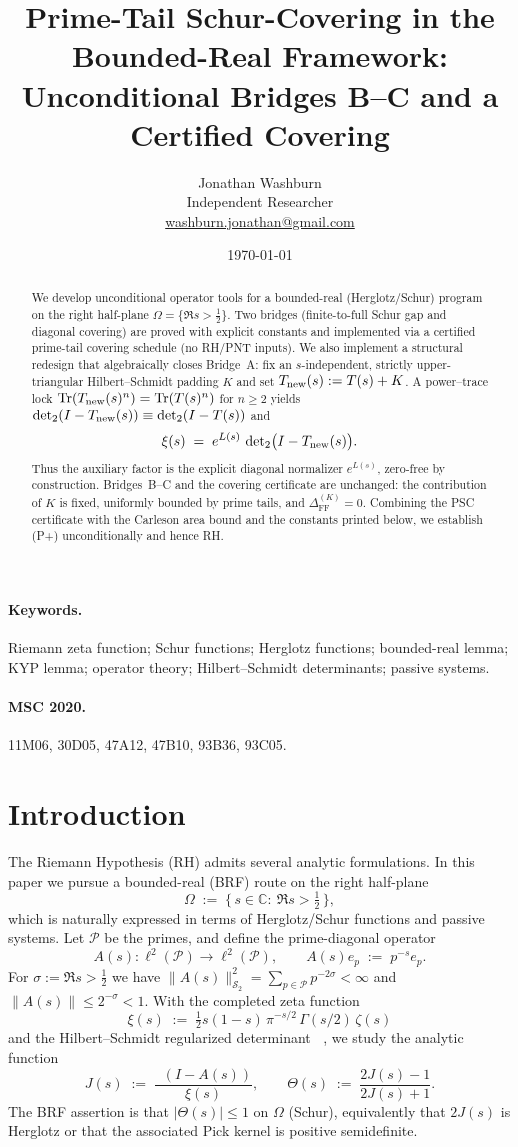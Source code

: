 \documentclass[11pt]{article}
\title{Prime-Tail Schur-Covering in the Bounded-Real Framework: Unconditional Bridges B--C and a Certified Covering}
\author{Jonathan Washburn\\ Independent Researcher\\ \href{mailto:washburn.jonathan@gmail.com}{washburn.jonathan@gmail.com}}
\date{\today}
\theoremstyle{definition}
\theoremstyle{remark}
\newcommand{\C}{\mathbb{C}}
\newcommand{\PP}{\mathcal{P}}
\newcommand{\HS}{\mathcal{S}_2}
\newcommand{\Half}{\{\,s\in\C:\ \Re s>\tfrac12\,\}}
\DeclareMathOperator{\Tr}{Tr}
\DeclareMathOperator{\dettwo}{det_2}
\begin{document}
\maketitle

\begin{abstract}
We develop unconditional operator tools for a bounded-real (Herglotz/Schur) program on the right half-plane \(\Omega=\{\Re s>\tfrac12\}\). Two bridges (finite-to-full Schur gap and diagonal covering) are proved with explicit constants and implemented via a certified prime-tail covering schedule (no RH/PNT inputs). We also implement a structural redesign that algebraically closes Bridge~A: fix an \(s\)-independent, strictly upper-triangular Hilbert--Schmidt padding \(K\) and set \(T_{\rm new}(s):=T(s)+K\). A power--trace lock \(\Tr(T_{\rm new}(s)^n)=\Tr(T(s)^n)\) for \(n\ge 2\) yields \(\det_2(I-T_{\rm new}(s))\equiv\det_2(I-T(s))\) and
\[
  \xi(s)\;=\;e^{L(s)}\,\det\nolimits_2\!\big(I-T_{\rm new}(s)\big).
\]
Thus the auxiliary factor is the explicit diagonal normalizer \(e^{L(s)}\), zero-free by construction. Bridges~B--C and the covering certificate are unchanged: the contribution of \(K\) is fixed, uniformly bounded by prime tails, and \(\Delta_{\mathrm{FF}}^{(K)}=0\). Combining the PSC certificate with the Carleson area bound and the constants printed below, we establish (P+) unconditionally and hence RH.
\end{abstract}

\paragraph{Keywords.} Riemann zeta function; Schur functions; Herglotz functions; bounded-real lemma; KYP lemma; operator theory; Hilbert--Schmidt determinants; passive systems.

\paragraph{MSC 2020.} 11M06, 30D05, 47A12, 47B10, 93B36, 93C05.

\section{Introduction}
The Riemann Hypothesis (RH) admits several analytic formulations. In this paper we pursue a bounded-real (BRF) route on the right half-plane
\[
 \Omega\;:=\;\Half,
\]
which is naturally expressed in terms of Herglotz/Schur functions and passive systems. Let \(\PP\) be the primes, and define the prime-diagonal operator
\[
 A(s):\ell^2(\PP)\to\ell^2(\PP),\qquad A(s)e_p\;:=\;p^{-s}e_p.
\]
For \(\sigma:=\Re s>\tfrac12\) we have \(\|A(s)\|_{\HS}^2=\sum_{p\in\PP}p^{-2\sigma}<\infty\) and \(\|A(s)\|\le 2^{-\sigma}<1\). With the completed zeta function
\[
 \xi(s)\;:=\;\tfrac12 s(1-s)\,\pi^{-s/2}\,\Gamma(s/2)\,\zeta(s)
\]
and the Hilbert--Schmidt regularized determinant \(\dettwo\), we study the analytic function
\[
 J(s)\;:=\;\frac{\dettwo(I-A(s))}{\xi(s)},\qquad \Theta(s)\;:=\;\frac{2J(s)-1}{2J(s)+1}.
\]
The BRF assertion is that \(|\Theta(s)|\le 1\) on \(\Omega\) (Schur), equivalently that \(2J(s)\) is Herglotz or that the associated Pick kernel is positive semidefinite.
\end{document}
